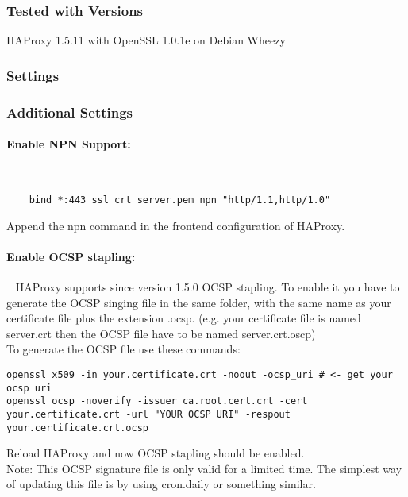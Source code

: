 \subsubsection{Tested with Versions}
\begin{itemize*}
  \item HAProxy 1.5.11 with OpenSSL 1.0.1e on Debian Wheezy
\end{itemize*}

\subsubsection{Settings}

\subsubsection{Additional Settings}
\paragraph*{Enable \ac{NPN} Support:}
~
\begin{lstlisting}
	bind *:443 ssl crt server.pem npn "http/1.1,http/1.0"
\end{lstlisting}
Append the npn command in the frontend configuration of HAProxy.

\paragraph*{Enable OCSP stapling:}
~
HAProxy supports since version 1.5.0 OCSP stapling. To enable it you have to generate the OCSP singing file in the same folder, with the same name as your certificate file plus the extension .ocsp. (e.g. your certificate file is named server.crt then the OCSP file have to be named server.crt.oscp)\\
To generate the OCSP file use these commands:
\begin{lstlisting}
openssl x509 -in your.certificate.crt -noout -ocsp_uri # <- get your ocsp uri
openssl ocsp -noverify -issuer ca.root.cert.crt -cert your.certificate.crt -url "YOUR OCSP URI" -respout your.certificate.crt.ocsp
\end{lstlisting}
Reload HAProxy and now OCSP stapling should be enabled.\\
Note: This OCSP signature file is only valid for a limited time. The simplest way of updating this file is by using cron.daily or something similar.


